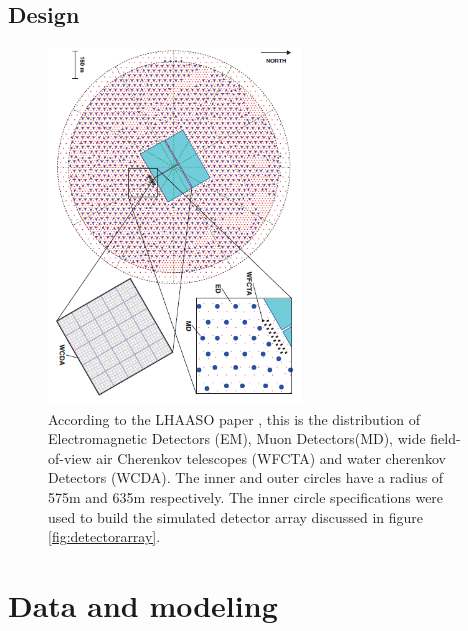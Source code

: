 \documentclass{article}
\begin{document}
\begin{appendices}
\subsection{Design}
\begin{figure}[!h]
    \centering
    \includegraphics[width=0.6\textwidth]{imgs/detect_array_lhaaso_paper.PNG}
    \caption{According to the LHAASO paper \cite{LHAASOpaper}, this is the   distribution of Electromagnetic Detectors (EM), Muon Detectors(MD), wide field-of-view air Cherenkov telescopes (WFCTA) and water cherenkov Detectors (WCDA).  The inner and outer circles have a radius of 575m and 635m respectively. The inner circle specifications were used to build the simulated detector array discussed in figure \ref{fig:detectorarray}. }
    \label{fig:lhaasodesign}
\end{figure}

\newpage
\section{Data and modeling}

\end{appendices}
\end{document}
